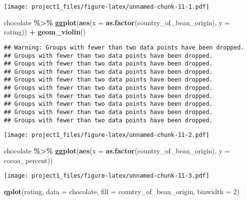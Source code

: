 \documentclass[
]{article}
\newenvironment{Shaded}{\begin{snugshade}}{\end{snugshade}}
\newcommand{\AttributeTok}[1]{\textcolor[rgb]{0.13,0.29,0.53}{#1}}
\newcommand{\DecValTok}[1]{\textcolor[rgb]{0.00,0.00,0.81}{#1}}
\newcommand{\FunctionTok}[1]{\textcolor[rgb]{0.13,0.29,0.53}{\textbf{#1}}}
\newcommand{\NormalTok}[1]{#1}
\newcommand{\SpecialCharTok}[1]{\textcolor[rgb]{0.81,0.36,0.00}{\textbf{#1}}}
\begin{document}
\texttt{[image: project1\_files/figure-latex/unnamed-chunk-11-1.pdf]}

\begin{Shaded}
\begin{Highlighting}[]
\NormalTok{chocolate }\SpecialCharTok{\%\textgreater{}\%} \FunctionTok{ggplot}\NormalTok{(}\FunctionTok{aes}\NormalTok{(}\AttributeTok{x =} \FunctionTok{as.factor}\NormalTok{(country\_of\_bean\_origin), }\AttributeTok{y =}\NormalTok{ rating)) }\SpecialCharTok{+} \FunctionTok{geom\_violin}\NormalTok{()}
\end{Highlighting}
\end{Shaded}

\begin{verbatim}
## Warning: Groups with fewer than two data points have been dropped.
## Groups with fewer than two data points have been dropped.
## Groups with fewer than two data points have been dropped.
## Groups with fewer than two data points have been dropped.
## Groups with fewer than two data points have been dropped.
## Groups with fewer than two data points have been dropped.
## Groups with fewer than two data points have been dropped.
## Groups with fewer than two data points have been dropped.
## Groups with fewer than two data points have been dropped.
## Groups with fewer than two data points have been dropped.
\end{verbatim}

\texttt{[image: project1\_files/figure-latex/unnamed-chunk-11-2.pdf]}

\begin{Shaded}
\begin{Highlighting}[]
\NormalTok{chocolate }\SpecialCharTok{\%\textgreater{}\%} \FunctionTok{ggplot}\NormalTok{(}\FunctionTok{aes}\NormalTok{(}\AttributeTok{x =} \FunctionTok{as.factor}\NormalTok{(country\_of\_bean\_origin), }\AttributeTok{y =}\NormalTok{ cocoa\_percent))}
\end{Highlighting}
\end{Shaded}

\texttt{[image: project1\_files/figure-latex/unnamed-chunk-11-3.pdf]}

\begin{Shaded}
\begin{Highlighting}[]
\FunctionTok{qplot}\NormalTok{(rating, }\AttributeTok{data =}\NormalTok{ chocolate, }\AttributeTok{fill =}\NormalTok{ country\_of\_bean\_origin, }\AttributeTok{binwidth =} \DecValTok{2}\NormalTok{)}
\end{Highlighting}
\end{Shaded}
\end{document}
